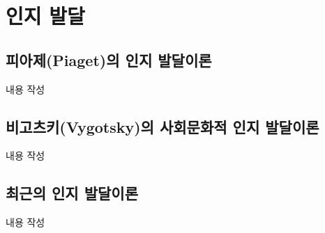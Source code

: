 \section{인지 발달}

\subsection{피아제(Piaget)의 인지 발달이론}
내용 작성

\subsection{비고츠키(Vygotsky)의 사회문화적 인지 발달이론}
내용 작성

\subsection{최근의 인지 발달이론}
내용 작성
